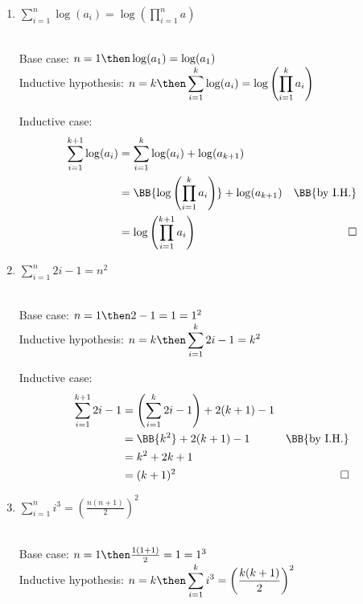 \documentclass[basic, header]{nosvagor-notes}
\begin{document}
\begin{enumerate}[itemsep=4em]
\begin{enumerate}[leftmargin=2em]
  \newpage %

      \item \(\displaystyle \sum_{i=1}^{n} \log(a_i) = \log \left( \prod_{i=1}^{n} a \right) \)

        \\
        Base case: \(n=1 \then \log(a_1) = \log(a_1)\) \\
        Inductive hypothesis: \(\displaystyle n= k
        \then
        \sum_{i=1}^{k} \log(a_i) = \log\left( \prod_{i=1}^{k} a_i  \right) \)

        Inductive case:
        \begin{align*}
         \sum_{i=1}^{k+1} \log(a_i)
         &= \sum_{i=1}^{k} \log(a_i) + \log(a_{k+1} )\\
         &= \BB{\log\left( \prod_{i=1}^{k} a_i \right)} + \log(a_{k+1} )
         & \text{\BB{by I.H.}}  \\
         &= \log\left(\prod_{i=1}^{k+1} a_i \right) & \qed
        \end{align*}


      \item \(\displaystyle \sum_{i=1}^{n} 2i - 1 = n^2 \)

        \\
        Base case: \(n = 1 \then 2 - 1 = 1 = 1^2\) \\
        Inductive hypothesis: \(\displaystyle
        n = k \then
        \sum_{i=1}^{k} 2i - 1 = k^2\)

        Inductive case:
        \begin{align*}
          \sum_{i=1}^{k+1} 2i - 1
          &= \left( \sum_{i=1}^{k} 2i - 1 \right)  + 2(k + 1) - 1\\
          &= \BB{k^2} + 2(k+1) -1 & \text{\BB{by I.H.}} \\
          &= k^2 + 2k + 1 \\
          &= (k+1)^2 & \qed
        \end{align*}

  \newpage %

      \item \(\displaystyle \sum_{i=1}^{n} i^3 = \left( \frac{n(n+1)}{2} \right)^2 \)

        \\
        Base case: \(n = 1 \then \frac{1(1+1)}{2} = 1 = 1^3\) \\
        Inductive hypothesis: \(\displaystyle
        n = k \then
        \sum_{i=1}^{k} i^3 = \left( \frac{k(k+1)}{2} \right)^2
        \)


\end{enumerate}
\end{enumerate}
\end{document}

